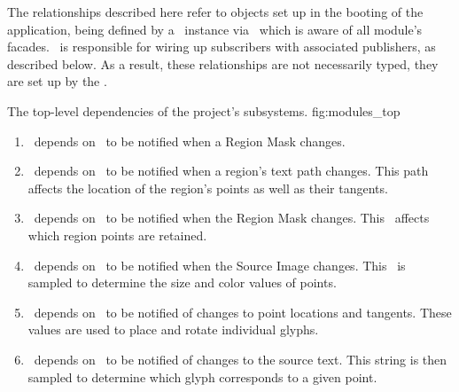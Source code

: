 The relationships described here refer to objects set up in the booting of the application, being defined by a \sysfact\ instance via \sysbldr\ which is aware of all module's facades.
\sysbldr\ is responsible for wiring up subscribers with associated publishers, as described below.
As a result, these relationships are not necessarily typed, they are set up by the \sysfact.

{The top-level dependencies of the project's subsystems.}
{fig:modules_top}
{\diagsize}

\begin{enumerate}
  \item \linemod\ depends on \regmod\ to be notified when a Region Mask changes.
  \item \ptmod\ depends on \linemod\ to be notified when a region's text path changes.  This path affects the location of the region's points as well as their tangents.
  \item \ptmod\ depends on \regmod\ to be notified when the Region Mask changes.  This \bmtype\ affects which region points are retained.
  \item \ptmod\ depends on \srcmod\ to be notified when the Source Image changes.  This \bmtype\ is sampled to determine the size and color values of points.
  \item \glymod\ depends on \ptmod\ to be notified of changes to point locations and tangents.  These values are used to place and rotate individual glyphs.
  \item \glymod\ depends on \srcmod\ to be notified of changes to the source text.  This string is then sampled to determine which glyph corresponds to a given point.
\end{enumerate}

